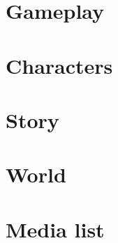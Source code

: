 \documentclass[15pt, a4paperm, hidelinks]{article}
\begin{document}
\section{Gameplay}

\clearpage

\section{Characters}

\clearpage

\section{Story}

\clearpage

\section{World}

\clearpage

\section{Media list}

\end{document}
